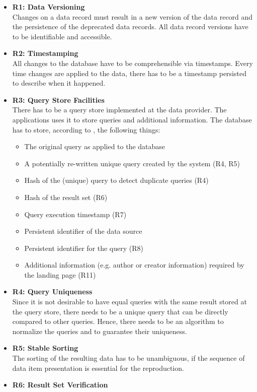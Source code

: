 \documentclass[draft,final]{vutinfth} %
\begin{document}
\begin{itemize}
	\item \textbf{R1: Data Versioning} \\
	Changes on a data record must result in a new version of the data record and the persistence of the deprecated data records. All data record versions have to be identifiable and accessible. 
	\item \textbf{R2: Timestamping} \\
	All changes to the database have to be comprehensible via timestamps. Every time changes are applied to the data, there has to be a timestamp persisted to describe when it happened. 
	\item \textbf{R3: Query Store Facilities} \\
	There has to be a query store implemented at the data provider. The applications uses it to store queries and additional information. The database has to store, according to \cite{rauber2016identification}, the following things: 
	\begin{itemize}
		\item The original query as applied to the database
		\item A potentially re-written unique query created by the system (R4, R5)
		\item Hash of the (unique) query to detect duplicate queries (R4)
		\item Hash of the result set (R6)
		\item Query execution timestamp (R7)
		\item Persistent identifier of the data source
		\item Persistent identifier for the query (R8)
		\item Additional information (e.g. author or creator information) required by the landing page (R11)
	\end{itemize}
	\item \textbf{R4: Query Uniqueness} \\
	Since it is not desirable to have equal queries with the same result stored at the query store, there needs to be a unique query that can be directly compared to other queries. Hence, there needs to be an algorithm to normalize the queries and to guarantee their uniqueness.
	\item \textbf{R5: Stable Sorting} \\
	The sorting of the resulting data has to be unambiguous, if the sequence of data item presentation is essential for the reproduction.
	\item \textbf{R6: Result Set Verification} \\

\end{itemize}
\end{document}
